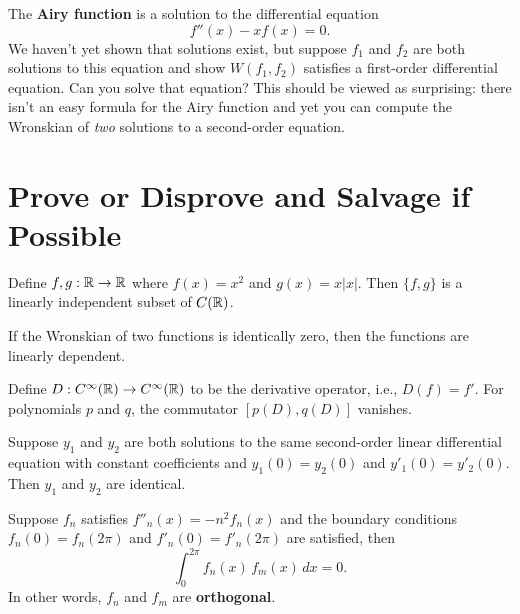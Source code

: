 \documentclass{homework}
\begin{document}
\begin{problem}\label{introduction-airy-function}The \textbf{Airy function} is a solution to the differential equation
  \[
    f''(x) - x f(x) = 0.
  \]
  We haven't yet shown that solutions exist, but suppose $f_1$ and
  $f_2$ are both solutions to this equation and show $W(f_1,f_2)$
  satisfies a first-order differential equation.  Can you solve that
  equation?  This should be viewed as surprising: there isn't an easy
  formula for the Airy function and yet you can compute the Wronskian
  of \textit{two} solutions to a second-order equation.
\end{problem}

\section{Prove or Disprove and Salvage if Possible}

\begin{problem}\label{wrongskian-example}Define $f, g : \mathbb{R} \to \mathbb{R}$ where $f(x) = x^2$ and $g(x) = x |x|$.  Then $\{ f, g \}$ is a linearly independent subset of $C(\mathbb{R})$.
\end{problem}

\begin{problem}\label{wronskian-misconception}If the Wronskian of two functions is identically zero, then the
  functions are linearly dependent.
\end{problem}

\begin{problem}Define $D : C^\infty(\mathbb{R}) \to C^\infty(\mathbb{R})$ to be the
  derivative operator, i.e., $D(f) = f'$.  For polynomials $p$ and
  $q$, the commutator $[p(D),q(D)]$ vanishes.
\end{problem}

\begin{problem}\label{uniqueness-for-second-order}Suppose $y_1$ and $y_2$ are both solutions to the same second-order linear differential equation with constant coefficients and $y_1(0) = y_2(0)$ and $y'_1(0) = y'_2(0)$.  Then $y_1$ and $y_2$ are identical.
\end{problem}

\begin{problem}\label{wave-equation-orthogonal}Suppose $f_n$ satisfies $f''_n(x) = - n^2 f_n(x)$ and the boundary conditions $f_n(0) = f_n(2\pi)$ and $f'_n(0) = f'_n(2\pi)$ are satisfied, then
  \[
    \int_0^{2\pi} f_n(x) \, f_m(x) \, dx = 0.
  \]
  In other words, $f_n$ and $f_m$ are \textbf{orthogonal}.
\end{problem}
\end{document}
